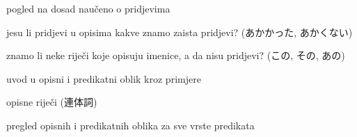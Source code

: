 
\author{Tomislav Mamić}

	
	
	\begin{hyou}
		\item pogled na dosad naučeno o pridjevima
		\begin{hyou}
			\item jesu li pridjevi u opisima kakve znamo zaista pridjevi? (あかかった, あかくない)
			\item znamo li neke riječi koje opisuju imenice, a da nisu pridjevi? (この, その, あの)
		\end{hyou}
		\item uvod u opisni i predikatni oblik kroz primjere
		\item opisne riječi (連体詞)
		\item pregled opisnih i predikatnih oblika za sve vrste predikata
	\end{hyou}
	
